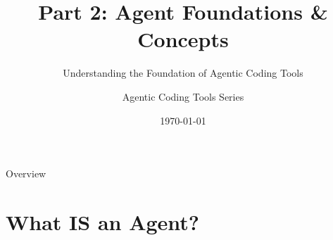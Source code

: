 \documentclass[aspectratio=169, 11pt]{beamer}
\title[Part 2: Agent Foundations]{Part 2: Agent Foundations \& Concepts}
\subtitle{Understanding the Foundation of Agentic Coding Tools}
\author{Agentic Coding Tools Series}
\institute{University of South Carolina}
\date{\today}
\begin{document}
\begin{frame}[plain]
    \titlepage
\end{frame}

\begin{frame}{Overview}
    \tableofcontents
\end{frame}

\section{What IS an Agent?}
\end{document}
